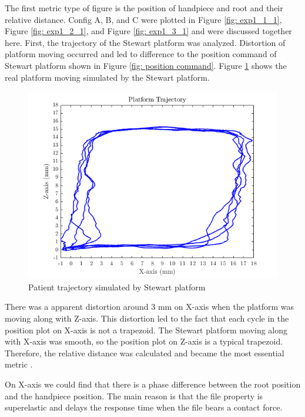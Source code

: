 \par
The first metric type of figure is the position of handpiece and root and their relative distance. Config A, B, and C were plotted in Figure \ref{fig: exp1_1_1}, Figure \ref{fig: exp1_2_1}, and Figure \ref{fig: exp1_3_1} and were discussed together here. First, the trajectory of the Stewart platform was analyzed. Distortion of platform moving occurred and led to difference to the position command of Stewart platform shown in Figure \ref{fig:  position command}. Figure \ref{fig: distortion} shows the real platform moving simulated by the Stewart platform.
\begin{figure}[htbp]
\begin{center}
\includegraphics[width=0.8\linewidth]{Images/exp/platform moving.png}
\caption{Patient trajectory simulated by Stewart platform }
\label{fig: distortion}
\end{center}
\end{figure}	
\par
There was a apparent distortion around $3$ mm on X-axis when the platform was moving along with Z-axis. This distortion led to the fact that each cycle in the position plot on X-axis is not a trapezoid. The Stewart platform moving along with X-axis was smooth, so the position plot on Z-axis is a typical trapezoid. Therefore, the relative distance was calculated and became the most essential metric . 
\par
On X-axis we could find that there is a phase difference between the root position and the handpiece position. The main reason is that the file property is superelastic and delays the response time when the file bears a contact force. 
\par
